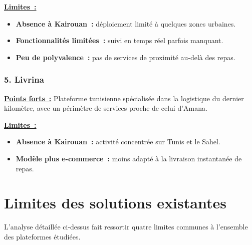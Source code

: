 \documentclass[12pt,fleqn,a4paper]{report}
\begin{document}
\begin{justify}
\vspace{0.2cm}
\noindent \textbf{\underline{Limites~:}}
\begin{itemize}
    \item \textbf{Absence à Kairouan~:} déploiement limité à quelques zones urbaines.
    \item \textbf{Fonctionnalités limitées~:} suivi en temps réel parfois manquant.
    \item \textbf{Peu de polyvalence~:} pas de services de proximité au-delà des repas.
\end{itemize}

\vspace{0.4cm}

\subsubsection*{\Large \textbf{5. Livrina}}
\vspace{0.2cm}

\noindent \textbf{\underline{Points forts~:}}
Plateforme tunisienne spécialisée dans la logistique du dernier kilomètre, avec un périmètre de services proche de celui d'Amana.

\vspace{0.2cm}
\noindent \textbf{\underline{Limites~:}}
\begin{itemize}
    \item \textbf{Absence à Kairouan~:} activité concentrée sur Tunis et le Sahel.
    \item \textbf{Modèle plus e-commerce~:} moins adapté à la livraison instantanée de repas.
\end{itemize}

\section{Limites des solutions existantes}

L'analyse détaillée ci-dessus fait ressortir quatre limites communes à l'ensemble des plateformes étudiées.


\end{justify}
\end{document}
